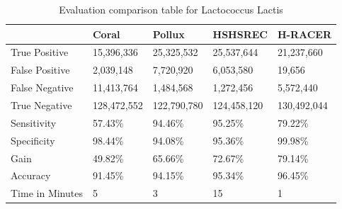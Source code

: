 \documentclass{llncs}
\newcommand{\TBstrut}{{\rule{0pt}{2ex}}{\rule[2ex]{0pt}{0pt}}} %
\begin{document}
\begin{longtable}{|m{33mm}|m{20mm}|m{20mm}|m{20mm}|m{20mm}|}
	    \caption{\label{tab:eval-1}Evaluation comparison table for Lactococcus Lactis}\\
        \hline
           & Coral & Pollux & HSHSREC & H-RACER\cellcolor{DarkGray} \TBstrut\\ %
        \hline
           True Positive & 15,396,336 &  25,325,532 & 25,537,644 & 21,237,660\cellcolor{LightGray} \TBstrut\\ %
        \hline
           False Positive & 2,039,148 &  7,720,920 & 6,053,580 & 19,656\cellcolor{LightGray} \TBstrut\\ %
        \hline
           False Negative & 11,413,764 & 1,484,568 & 1,272,456 & 5,572,440\cellcolor{LightGray} \TBstrut\\ %
        \hline
           True Negative & 128,472,552 & 122,790,780 & 124,458,120 & 130,492,044\cellcolor{LightGray} \TBstrut\\ %
        \hline
           Sensitivity & 57.43\% & 94.46\% & 95.25\% & 79.22\%\cellcolor{LightGray} \TBstrut\\ %
        \hline
           Specificity & 98.44\% & 94.08\% & 95.36\% & 99.98\%\cellcolor{LightGray} \TBstrut\\ %
        \hline
           Gain & 49.82\% & 65.66\% & 72.67\% & 79.14\%\cellcolor{LightGray} \TBstrut\\ %
        \hline
           Accuracy & 91.45\% & 94.15\% & 95.34\% & 96.45\%\cellcolor{LightGray} \TBstrut\\ %
        \hline
           Time in Minutes& 5 & 3 & 15 & 1\cellcolor{LightGray} \TBstrut\\ %
        \hline
\end{longtable}
\end{document}

